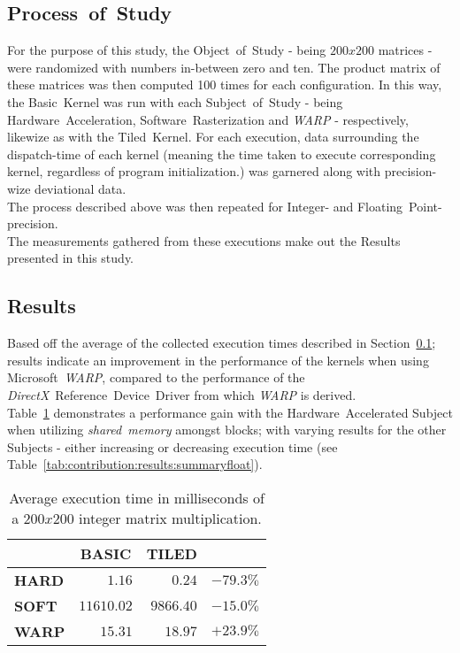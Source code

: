 \documentclass[fleqn,10pt]{SelfArx} %
\begin{document}
\subsection{Process~of~Study}
\label{sec:contribution:processofstudy}
For the purpose of this study, the Object~of~Study - being $200x200$ matrices - were randomized with numbers in-between zero and ten. The product matrix of these matrices was then computed 100 times for each configuration. In this way, the Basic~Kernel was run with each Subject~of~Study - being Hardware~Acceleration, Software~Rasterization and \textit{WARP} - respectively, likewize as with the Tiled~Kernel. For each execution, data surrounding the dispatch-time of each kernel (meaning the time taken to execute corresponding kernel, regardless of program initialization.) was garnered along with precision-wize deviational data.\\
The process described above was then repeated for Integer- and Floating~Point-precision.\\

\noindent
The measurements gathered from these executions make out the Results presented in this study.

\subsection{Results}
\label{sec:contribution:results}
Based off the average of the collected execution times described in Section~\ref{sec:contribution:processofstudy}; results indicate an improvement in the performance of the kernels when using Microsoft~\textit{WARP}, compared to the performance of the \textit{DirectX}~Reference~Device~Driver from which \textit{WARP} is derived.\\
Table~\ref{tab:contribution:results:summaryint} demonstrates a performance gain with the Hardware~Accelerated Subject when utilizing \textit{shared~memory} amongst blocks; with varying results for the other Subjects - either increasing or decreasing execution time (see Table~\ref{tab:contribution:results:summaryfloat}).

\begin{table}[hbt]
\begin{center}
\begin{tabular}{r|r|r|r|}
	\cline{2-3}
							& \multicolumn{1}{|c|}{\textbf{BASIC}} & \multicolumn{1}{|c|}{\textbf{TILED}}	\\ \hline
	\multicolumn{1}{|l|}{\textbf{HARD}}	& $1.16$			& $0.24$ 	& $-79.3\%$    					\\ \hline
	\multicolumn{1}{|l|}{\textbf{SOFT}}	& $11610.02$		& $9866.40$	& $-15.0\%$     					\\ \hline
	\multicolumn{1}{|l|}{\textbf{WARP}}	& $15.31$			& $18.97$	& $+23.9\%$     					\\ \hline
\end{tabular}
\end{center}
\caption{Average execution time in milliseconds of a $200x200$ integer matrix multiplication.}
\label{tab:contribution:results:summaryint}
\end{table}
\end{document}
